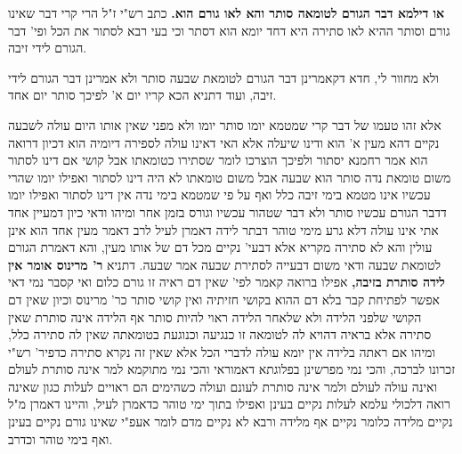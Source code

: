 \documentclass[12pt, openany]{book}
\newcommand{\sethebfont}{
\fontsize{10.5pt}{21.0pt} \selectfont
}
\newcommand{\twocol}[1]{
	{\sethebfont \begin{multicols}{2}
			#1
	\end{multicols}}	
}
\begin{document}
\twocol{\textbf{או דילמא דבר הגורם לטומאה סותר והא לאו גורם הוא.}  כתב רש"י ז"ל הרי קרי דבר שאינו גורם וסותר ההיא לאו סתירה היא דחד יומא הוא דסתר וכי בעי רבא לסתור את הכל ופי' דבר הגורם לידי זיבה.\par ולא מחוור לי, חדא דקאמרינן דבר הגורם לטומאת שבעה סותר ולא אמרינן דבר הגורם לידי זיבה, ועוד דתניא הכא קריו יום א' לפיכך סותר יום אחד.\par  אלא זהו טעמו של דבר קרי שמטמא יומו סותר יומו ולא מפני שאין אותו היום עולה לשבעה נקיים דהא מעין א' הוא ודינו שיעלה אלא האי דאינו עולה לספירה דיומיה הוא דכיון דרואה הוא אמר רחמנא יסתור ולפיכך הוצרכו לומר שסתירו כטומאתו אבל קושי אם דינו לסתור משום טומאת נדה סותר הוא שבעה אבל משום טומאתו לא היה דינו לסתור ואפילו יומו שהרי עכשיו אינו מטמא בימי זיבה כלל ואף על פי שמטמא בימי נדה אין דינו לסתור ואפילו יומו דדבר הגורם עכשיו סותר ולא דבר שטהור עכשיו וגורס בזמן אחר ומיהו ודאי כיון דמעיין אחד אתי אינו עולה דלא גרע מימי טוהר דבתר לידה דאמרן לעיל לרב דאמר מעין אחד הוא אינן עולין והא לא סתירה מקריא אלא דבעי' נקיים מכל דם של אותו מעין, והא דאמרת הגורם לטומאת שבעה ודאי משום דבעייה לסתירת שבעה אמר שבעה. 
\parוהא דתניא \textbf{ר' מרינוס אומר אין לידה סותרת בזיבה,}  אפילו ברואה קאמר לפי' שאין דם ראיה זו גורם כלום ואי קסבר נמי דאי אפשר לפתיחת קבר בלא דם ההוא בקושי חזיתיה ואין קושי סותר כר' מרינוס וכיון שאין דם הקושי שלפני הלידה ולא שלאחר הלידה ראוי להיות סותר אף הלידה אינה סותרת שאין סתירה אלא בראיה דהויא לה לטומאה זו כנגיעה וכנוגעת בטומאתה שאין לה סתירה כלל, ומיהו אם ראתה בלידה אין יומא עולה לדברי הכל אלא שאין זה נקרא סתירה כדפיר' רש"י זכרונו לברכה, והכי נמי מפרשינן בפלוגתא דאמוראי והכי נמי מתוקמא למר אינה סותרת לעולם ואינה עולה לעולם ולמר אינה סותרת לעונם ועולה כשהימים הם ראויים לעלות כגון שאינה רואה דלכולי עלמא לעלות נקיים בעינן ואפילו בתוך ימי טוהר כדאמרן לעיל, והיינו דאמרן מ"ל נקיים מלידה כלומר נקיים אף מלידה ורבא לא נקיים מדם לומר אעפ"י שאינו גורם נקיים בעינן ואף בימי טוהר וכדרב. 
}
\end{document}
